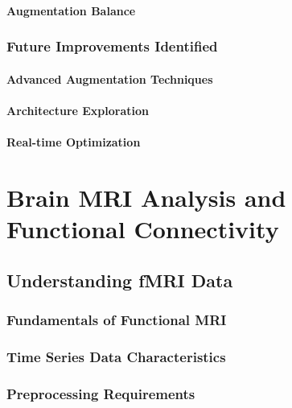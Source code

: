 \documentclass[12pt,a4paper]{report}
\begin{document}
\subsubsection{Augmentation Balance}

\subsection{Future Improvements Identified}

\subsubsection{Advanced Augmentation Techniques}

\subsubsection{Architecture Exploration}

\subsubsection{Real-time Optimization}

\chapter{Brain MRI Analysis and Functional Connectivity}

\section{Understanding fMRI Data}

\subsection{Fundamentals of Functional MRI}

\subsection{Time Series Data Characteristics}

\subsection{Preprocessing Requirements}
\end{document}
